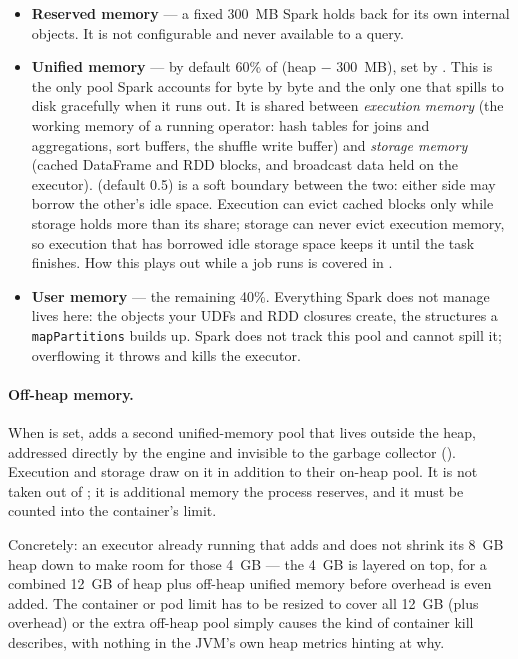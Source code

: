 \begin{itemize}
  \item \textbf{Reserved memory} --- a fixed 300~MB Spark holds back for its own
        internal objects. It is not configurable and never available to a query.
  \item \textbf{Unified memory} --- by default 60\% of (heap $-$ 300~MB), set by
        . This is the only pool Spark accounts for
        byte by byte and the only one that spills to disk gracefully when it runs
        out. It is shared between \emph{execution memory} (the working memory of a
        running operator: hash tables for joins and aggregations, sort buffers,
        the shuffle write buffer) and \emph{storage memory} (cached DataFrame and
        RDD blocks, and broadcast data held on the executor).
         (default 0.5) is a soft boundary
        between the two: either side may borrow the other's idle space. Execution
        can evict cached blocks only while storage holds more than its
         share; storage can never evict
        execution memory, so execution that has borrowed idle storage space keeps it
        until the task finishes. How this plays out while a job runs is covered in
        .
  \item \textbf{User memory} --- the remaining 40\%. Everything Spark does not
        manage lives here: the objects your UDFs and RDD closures create, the
        structures a \texttt{mapPartitions} builds up. Spark does not track this
        pool and cannot spill it; overflowing it throws
         and kills the executor.
\end{itemize}

\paragraph{Off-heap memory.} When  is set,
 adds a second unified-memory pool that lives
outside the heap, addressed directly by the engine and invisible to the garbage
collector (). Execution and storage draw on it in addition to
their on-heap pool. It is not taken out of ; it is
additional memory the process reserves, and it must be counted into the
container's limit.

Concretely: an executor already running  that
adds  and
 does not shrink its 8~GB heap down to make
room for those 4~GB --- the 4~GB is layered on top, for a combined 12~GB of
heap plus off-heap unified memory before overhead is even added. The
container or pod limit has to be resized to cover all 12~GB (plus overhead)
or the extra off-heap pool simply causes the kind of container kill
 describes, with nothing in the JVM's own heap
metrics hinting at why.


